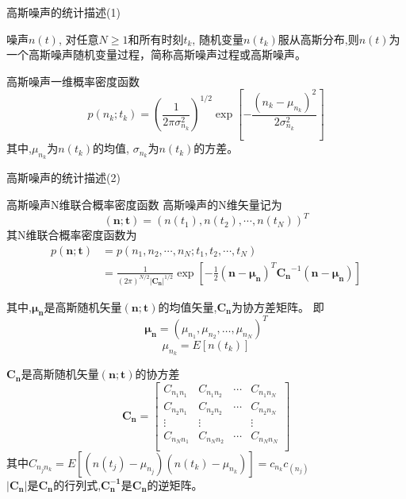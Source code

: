 \begin{frame}{高斯噪声的统计描述(1)}
\begin{definition}[高斯噪声]
	噪声$n(t)$, 对任意$N\ge 1$和所有时刻$t_k$, 随机变量$n(t_k)$服从高斯分布,则$n(t)$为一个高斯噪声随机变量过程，简称高斯噪声过程或高斯噪声。
\end{definition}
\begin{block}{高斯噪声一维概率密度函数}
	\[p(n_k;t_k)=(\frac{1}{2\pi\sigma_{n_k}^2})^{1/2}\exp\left[-\frac{(n_k-\mu_{n_k})^2}{2\sigma_{n_k}^2}\right] \]
	其中,$\mu_{n_k}$为$n(t_k)$的均值, $\sigma_{n_k}$为$n(t_k)$的方差。
\end{block}
\end{frame}

\begin{frame}{高斯噪声的统计描述(2)}
\begin{block}{高斯噪声N维联合概率密度函数}
高斯噪声的N维矢量记为
\[(\bm{n;t})=(n(t_1),n(t_2),\cdots,n(t_N))^T \]
其N维联合概率密度函数为
\begin{align*}
p(\bm{n;t})&=p(n_1,n_2,\cdots,n_N; t_1,t_2,\cdots,t_N)\\
&=\frac{1}{(2\pi)^{N/2}|\bm{C_n}|^{1/2}}\exp\left[-\frac{1}{2}(\bm{n-\mu_n})^T\bm{C_n}^{-1}(\bm{n-\mu_n})\right]
\end{align*}

其中,$\bm{\mu_{n}}$是高斯随机矢量$(\bm{n;t})$的均值矢量,$\bm{C_n}$为协方差矩阵。
即
$$\bm{\mu_n}=(\mu_{n_1},\mu_{n_2},\dots,\mu_{n_N})^T$$
$$\mu_{n_k}=E[n(t_k)]$$
\end{block}
\end{frame}

\begin{frame}
$\bm{C_n}$是高斯随机矢量$\bm{(n;t)}$的协方差
$$
\bm{C_n}=\left[
\begin{matrix}
C_{n_1n_1} & C_{n_1n_2} & \cdots &C_{n_1n_N} \\
C_{n_2n_1} & C_{n_2n_2} & \cdots &C_{n_2n_N} \\
\vdots     &  \vdots    &        &\vdots \\
C_{n_Nn_1} & C_{n_Nn_2} & \cdots &C_{n_Nn_N} \\
\end{matrix}
\right]
$$
其中$C_{n_jn_k}=E[(n(t_j)-\mu_{n_j})(n(t_k)-\mu_{n_k})]=c_{n_k}c_(n_j)$\\
$|\bm{C_n}|$是$\bm{C_n}$的行列式,$\bm{C_n^{-1}}$是$\bm{C_n}$的逆矩阵。
\end{frame}

